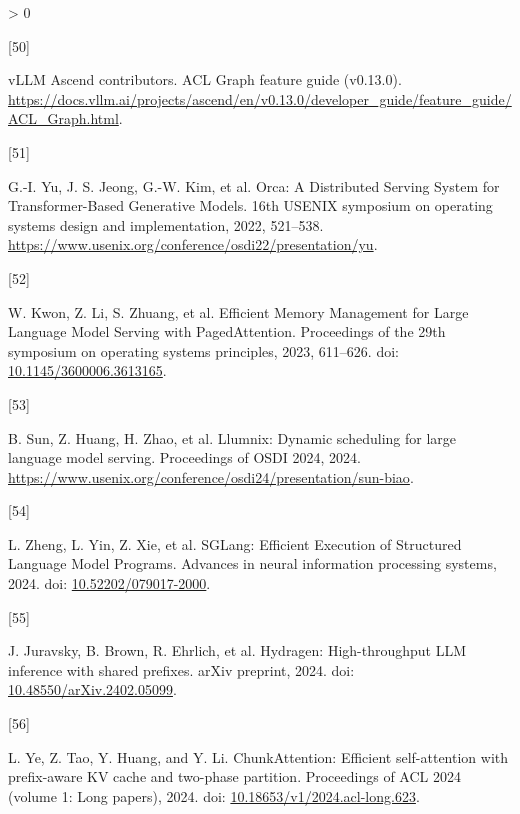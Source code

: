\documentclass[UTF8,10.5pt,fontset=windows]{ctexart}
\newlength{\cslhangindent}
\newlength{\csllabelwidth}
\newenvironment{CSLReferences}[2] %
 {%
  \setlength{\parindent}{0pt}
  \ifodd #1 \everypar{\setlength{\hangindent}{\cslhangindent}}\ignorespaces\fi
  \ifnum #2 > 0
  \setlength{\parskip}{#2\baselineskip}
  \fi
 }%
 {}
\newcommand{\CSLLeftMargin}[1]{\parbox[t]{\csllabelwidth}{#1}}
\newcommand{\CSLRightInline}[1]{\parbox[t]{\linewidth - \csllabelwidth}{#1}\break}
\begin{document}
\begin{CSLReferences}{0}{0}
\leavevmode{}%
\CSLLeftMargin{{[}50{]} }
\CSLRightInline{vLLM Ascend contributors. {ACL Graph feature guide
(v0.13.0)}.
\url{https://docs.vllm.ai/projects/ascend/en/v0.13.0/developer_guide/feature_guide/ACL_Graph.html}.}

\leavevmode{}%
\CSLLeftMargin{{[}51{]} }
\CSLRightInline{G.-I. Yu, J. S. Jeong, G.-W. Kim, et al. {Orca: A
Distributed Serving System for Transformer-Based Generative Models}.
16th USENIX symposium on operating systems design and implementation,
2022, 521--538.
\url{https://www.usenix.org/conference/osdi22/presentation/yu}.}

\leavevmode{}%
\CSLLeftMargin{{[}52{]} }
\CSLRightInline{W. Kwon, Z. Li, S. Zhuang, et al. {Efficient Memory
Management for Large Language Model Serving with PagedAttention}.
Proceedings of the 29th symposium on operating systems principles, 2023,
611--626. doi:
\href{https://doi.org/10.1145/3600006.3613165}{10.1145/3600006.3613165}.}

\leavevmode{}%
\CSLLeftMargin{{[}53{]} }
\CSLRightInline{B. Sun, Z. Huang, H. Zhao, et al. Llumnix: Dynamic
scheduling for large language model serving. Proceedings of OSDI 2024,
2024.
\url{https://www.usenix.org/conference/osdi24/presentation/sun-biao}.}

\leavevmode{}%
\CSLLeftMargin{{[}54{]} }
\CSLRightInline{L. Zheng, L. Yin, Z. Xie, et al. {SGLang: Efficient
Execution of Structured Language Model Programs}. Advances in neural
information processing systems, 2024. doi:
\href{https://doi.org/10.52202/079017-2000}{10.52202/079017-2000}.}

\leavevmode{}%
\CSLLeftMargin{{[}55{]} }
\CSLRightInline{J. Juravsky, B. Brown, R. Ehrlich, et al. Hydragen:
High-throughput LLM inference with shared prefixes. arXiv preprint,
2024. doi:
\href{https://doi.org/10.48550/arXiv.2402.05099}{10.48550/arXiv.2402.05099}.}

\leavevmode{}%
\CSLLeftMargin{{[}56{]} }
\CSLRightInline{L. Ye, Z. Tao, Y. Huang, and Y. Li. ChunkAttention:
Efficient self-attention with prefix-aware KV cache and two-phase
partition. Proceedings of ACL 2024 (volume 1: Long papers), 2024. doi:
\href{https://doi.org/10.18653/v1/2024.acl-long.623}{10.18653/v1/2024.acl-long.623}.}


\end{CSLReferences}
\end{document}
